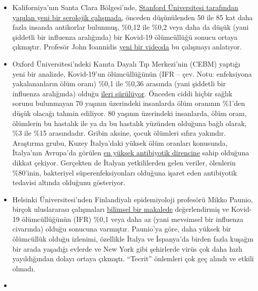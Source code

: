 \begin{itemize}
\tightlist
\item
  Kaliforniya'nın Santa Clara Bölgesi'nde,
  \href{https://www.medrxiv.org/content/10.1101/2020.04.14.20062463v1}{Stanford
  Üniversitesi tarafından yapılan yeni bir serolojik çalışmada,} önceden
  düşünülenden 50 ile 85 kat daha fazla insanda antikorlar bulunmuş,
  \%0,12 ile \%0,2 veya daha da düşük (yani şiddetli bir influenza
  aralığında) bir Kovid-19 ölümcüllüğü sonucu ortaya çıkmıştır. Profesör
  John Ioannidis \href{https://www.youtube.com/watch?v=jGUgrEfSgaU}{yeni
  bir videoda} bu çalışmayı anlatıyor.
\item
  Oxford Üniversitesi'ndeki Kanıta Dayalı Tıp Merkezi'nin (CEBM) yaptığı
  yeni bir analizde, Kovid-19'un ölümcüllüğünün (IFR -- çev. Notu:
  enfeksiyona yakalananların ölüm oranı) \%0,1 ile \%0,36 arasında (yani
  şiddetli bir influenza aralığında) olduğu
  \href{https://www.cebm.net/covid-19/global-covid-19-case-fatality-rates/}{ileri
  sürülüyor}. Önceden ciddi hiçbir sağlık sorunu bulunmayan 70 yaşının
  üzerindeki insanlarda ölüm oranının \%1'den düşük olacağı tahmin
  ediliyor. 80 yaşının üzerindeki insanlarda, ölüm oranı, ölümlerin bu
  hastalık ile ya da bu hastalık yüzünden olduğuna bağlı olarak, \%3 ile
  \%15 arasındadır. Gribin aksine, çocuk ölümleri sıfıra yakındır.
  Araştırma grubu, Kuzey İtalya'daki yüksek ölüm oranları konusunda,
  İtalya'nın Avrupa'da görülen
  \href{https://www.ansa.it/english/news/science_tecnology/2019/11/19/italy-top-in-eu-in-antibiotic-resistance_369e0123-0107-445e-8c17-f11932c9d27c.html}{en
  yüksek antibiyotik direncine} sahip olduğuna dikkat çekiyor. Gerçekten
  de İtalyan yetkililerden gelen veriler, ölenlerin \%80'inin,
  bakteriyel süperenfeksiyonları olduğuna işaret eden antibiyotik
  tedavisi altında olduğunu gösteriyor.
\item
  Helsinki Üniversitesi'nden Finlandiyalı epidemiyoloji profesörü Mikko
  Paunio, birçok uluslararası çalışmaları
  \href{https://lockdownsceptics.org/wp-content/uploads/2020/04/How-the-World-got-Fooled-by-COVID-ed-2c.pdf}{bilimsel
  bir makalede} değerlendirmiş ve Kovid-19 ölümcüllüğünün (IFR) \%0,1
  veya daha az (yani mevsimsel bir influenza civarında) olduğu sonucuna
  varmıştır. Paunio'ya göre, daha yüksek bir ölümcüllük olduğu izlenimi,
  özellikle İtalya ve İspanya'da birden fazla kuşağın bir arada yaşadığı
  evlerde ve New York gibi şehirlerde virüs çok daha hızlı yayıldığından
  dolayı ortaya çıkmıştı. ``Tecrit'' önlemleri çok geç alındı ve etkili
  olmadı.
\item

\end{itemize}
